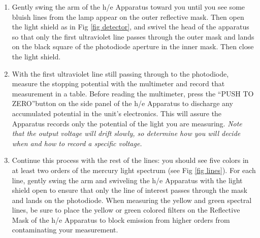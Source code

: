 \documentclass[11pt]{article}
\begin{document}
\vspace{5mm}


\begin{enumerate}

  
\item Gently swing the arm of the h/e Apparatus toward you until you see some bluish 
lines from the lamp appear on the outer reflective mask. Then open the light shield as 
in Fig \ref{fig detector}, and swivel the head of the apparatus so that only the first 
ultraviolet line passes through the outer mask and lands on the black square of the 
photodiode aperture in the inner mask. Then close the light shield.

\item With the first ultraviolet line still passing through to the photodiode, measure 
the stopping potential with the multimeter and record that measurement in a table. Before 
reading the multimeter, press the ``PUSH TO ZERO''button on the side panel of the h/e
Apparatus to discharge any accumulated potential in the unit's electronics. This
will assure the Apparatus records only the potential of the light you are
measuring. \textit{Note that the output voltage will drift slowly, so determine how you will decide when and how to record a specific voltage.}%


\item Continue this process with the rest of the lines: you should see five colors in at least two orders of the mercury light spectrum (see Fig \ref{fig lines}). For each line,  
gently swing the arm and swiveling the h/e Apparatus with the light shield open to
ensure that only the line of interest passes through the mask and lands on the photodiode. 
When measuring the yellow and green spectral lines, be sure to place the yellow or green 
colored filters on the Reflective Mask of the h/e Apparatus to block emission from higher 
orders from contaminating your measurement.


\end{enumerate}
\end{document}
